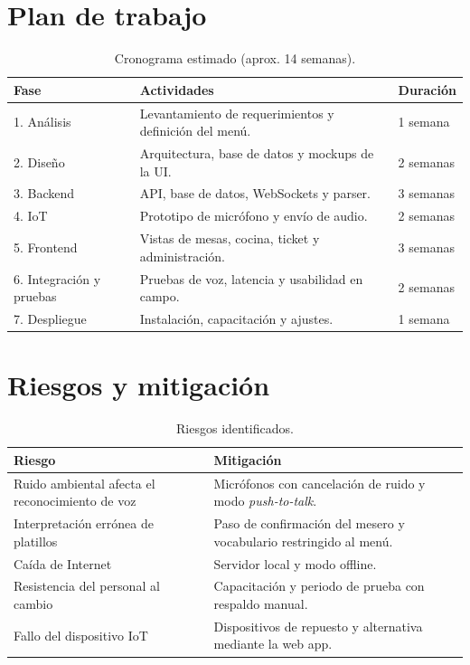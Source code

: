 \documentclass[11pt,letterpaper]{article}
\newcommand{\tabhead}[1]{\textbf{\color{white}#1}}
\newcommand{\encabezado}{\rowcolor{azulprincipal}}
\begin{document}
\section{Plan de trabajo}
\begin{table}[h!]
\centering
\begin{tabularx}{\textwidth}{l X l}
\toprule
\encabezado \tabhead{Fase} & \tabhead{Actividades} & \tabhead{Duración} \\
\midrule
1. Análisis & Levantamiento de requerimientos y definición del menú. & 1 semana \\
2. Diseño & Arquitectura, base de datos y mockups de la UI. & 2 semanas \\
3. Backend & API, base de datos, WebSockets y parser. & 3 semanas \\
4. IoT & Prototipo de micrófono y envío de audio. & 2 semanas \\
5. Frontend & Vistas de mesas, cocina, ticket y administración. & 3 semanas \\
6. Integración y pruebas & Pruebas de voz, latencia y usabilidad en campo. & 2 semanas \\
7. Despliegue & Instalación, capacitación y ajustes. & 1 semana \\
\bottomrule
\end{tabularx}
\caption{Cronograma estimado (aprox. 14 semanas).}
\end{table}

\section{Riesgos y mitigación}
\begin{table}[h!]
\centering
\begin{tabularx}{\textwidth}{l X}
\toprule
\encabezado \tabhead{Riesgo} & \tabhead{Mitigación} \\
\midrule
Ruido ambiental afecta el reconocimiento de voz & Micrófonos con cancelación de ruido y modo \textit{push-to-talk}. \\
Interpretación errónea de platillos & Paso de confirmación del mesero y vocabulario restringido al menú. \\
Caída de Internet & Servidor local y modo offline. \\
Resistencia del personal al cambio & Capacitación y periodo de prueba con respaldo manual. \\
Fallo del dispositivo IoT & Dispositivos de repuesto y alternativa mediante la web app. \\
\bottomrule
\end{tabularx}
\caption{Riesgos identificados.}
\end{table}
\end{document}
